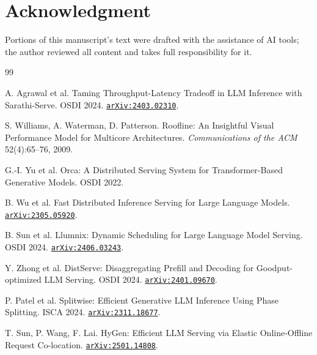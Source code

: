 \documentclass[conference]{IEEEtran}
\newcommand{\code}[1]{\texttt{#1}}
\begin{document}
\section*{Acknowledgment}

Portions of this manuscript's text were drafted with the assistance of AI tools; the
author reviewed all content and takes full responsibility for it.

\clearpage

\begin{thebibliography}{99}
\small
\raggedright

 A. Agrawal et al. Taming Throughput-Latency Tradeoff in LLM Inference with
Sarathi-Serve. OSDI 2024. \href{https://arxiv.org/abs/2403.02310}{\code{arXiv:2403.02310}}.

 S. Williams, A. Waterman, D. Patterson. Roofline: An Insightful Visual
Performance Model for Multicore Architectures. \emph{Communications of the ACM}
52(4):65--76, 2009.

 G.-I. Yu et al. Orca: A Distributed Serving System for Transformer-Based
Generative Models. OSDI 2022.

 B. Wu et al. Fast Distributed Inference Serving for Large Language
Models. \href{https://arxiv.org/abs/2305.05920}{\code{arXiv:2305.05920}}.

 B. Sun et al. Llumnix: Dynamic Scheduling for Large Language Model
Serving. OSDI 2024. \href{https://arxiv.org/abs/2406.03243}{\code{arXiv:2406.03243}}.

 Y. Zhong et al. DistServe: Disaggregating Prefill and Decoding for
Goodput-optimized LLM Serving. OSDI 2024.
\href{https://arxiv.org/abs/2401.09670}{\code{arXiv:2401.09670}}.

 P. Patel et al. Splitwise: Efficient Generative LLM Inference Using
Phase Splitting. ISCA 2024. \href{https://arxiv.org/abs/2311.18677}{\code{arXiv:2311.18677}}.

 T. Sun, P. Wang, F. Lai. HyGen: Efficient LLM Serving via Elastic
Online-Offline Request Co-location.
\href{https://arxiv.org/abs/2501.14808}{\code{arXiv:2501.14808}}.


\end{thebibliography}
\end{document}
